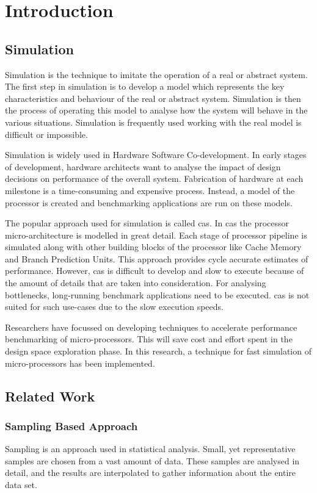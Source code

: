 \chapter{Introduction}\label{chapter:introduction}

\section{Simulation}

Simulation is the technique to imitate the operation of a real or abstract system. The first step in simulation is to develop a model which represents the key characteristics and behaviour of the real or abstract system. Simulation is then the process of operating this model to analyse how the system will behave in the various situations. Simulation is frequently used working with the real model is difficult or impossible.

Simulation is widely used in Hardware Software Co-development. In early stages of development, hardware architects want to analyse the impact of design decisions on performance of the overall system. Fabrication of hardware at each milestone is a time-consuming and expensive process. Instead, a model of the processor is created and benchmarking applications are run on these models.

The popular approach used for simulation is called \gls{cas}. In \gls{cas} the processor micro-architecture is modelled in great detail. Each stage of processor pipeline is simulated along with other building blocks of the processor like Cache Memory and Branch Prediction Units. This approach provides cycle accurate estimates of performance. However, \gls{cas} is difficult to develop and slow to execute because of the amount of details that are taken into consideration. For analysing bottlenecks, long-running benchmark applications need to be executed. \gls{cas} is not suited for such use-cases due to the slow execution speeds.

Researchers have focussed on developing techniques to accelerate performance benchmarking of micro-processors. This will save cost and effort spent in the design space exploration phase. In this research, a technique for fast simulation of micro-processors has been implemented. 

\section{Related Work}

\subsection{Sampling Based Approach}
Sampling is an approach used in statistical analysis. Small, yet representative samples are chosen from a vast amount of data. These samples are analysed in detail, and the results are interpolated to gather information about the entire data set.

